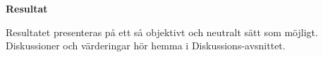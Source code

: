 \begin{mdframed}[innertopmargin=10pt, innerbottommargin=10pt, innerleftmargin=10pt, innerrightmargin=10pt, skipabove=10pt, skipbelow=10pt, roundcorner=10pt]
    \textbf{Resultat}
    
    Resultatet presenteras på ett så objektivt och neutralt sätt som möjligt. Diskussioner och värderingar hör hemma i Diskussions-avsnittet.
    \end{mdframed}